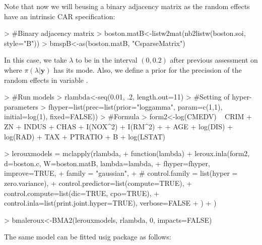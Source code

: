 \documentclass[article]{jss}
\begin{document}
Note that now we will beusing a binary adjacency matrix as the random
effects have an intrinsic CAR specification:
\begin{Schunk}
\begin{Sinput}
> #Binary adjacency matrix
> boston.matB<-listw2mat(nb2listw(boston.soi, style="B"))
> bmspB<-as(boston.matB, "CsparseMatrix")
\end{Sinput}
\end{Schunk}

In this case, we take $\lambda$ to be in the interval $(0,0.2)$ after previous
assessment on where $\pi(\lambda|\mathbf{y})$ has its mode. Also, we define
a prior for the precission of the random effects in variable .

\begin{Schunk}
\begin{Sinput}
> #Run models
> rlambda<-seq(0.01, .2, length.out=11)
> #Setting of hyper-parameters
> fhyper=list(prec=list(prior="loggamma", param=c(1,1), initial=log(1), fixed=FALSE))
> #Formula
> form2<-log(CMEDV) ~ CRIM + ZN + INDUS + CHAS + I(NOX^2) + I(RM^2) + 
+     AGE + log(DIS) + log(RAD) + TAX + PTRATIO + B + log(LSTAT)
\end{Sinput}
\end{Schunk}

\begin{Schunk}
\begin{Sinput}
> lerouxmodels = mclapply(rlambda,
+         function(lambda) {
+                 leroux.inla(form2, d=boston.c, W=boston.matB, lambda=lambda,
+                         fhyper=fhyper, improve=TRUE,
+                         family = "gaussian",
+ #   control.family = list(hyper = zero.variance),
+                         control.predictor=list(compute=TRUE),
+                         control.compute=list(dic=TRUE, cpo=TRUE),
+                         control.inla=list(print.joint.hyper=TRUE), verbose=FALSE
+                 )
+         })
\end{Sinput}
\end{Schunk}






\begin{Schunk}
\begin{Sinput}
> bmaleroux<-BMA2(lerouxmodels, rlambda, 0, impacts=FALSE)
\end{Sinput}
\end{Schunk}

The same model can be fitted usig package  as follows:
\end{document}

